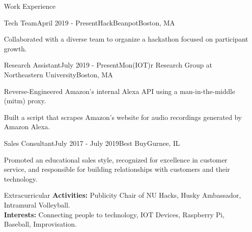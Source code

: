 \documentclass{resume}
\begin{document}
\begin{rSection}{Work Experience}

\begin{rSubsection}{Tech Team}{April 2019 - Present}{HackBeanpot}{Boston, MA}
\item Collaborated with a diverse team to organize a hackathon focused on participant growth.
\end{rSubsection}

\begin{rSubsection}{Research Assistant}{July 2019 - Present}{Mon(IOT)r Research Group at Northeastern University}{Boston, MA}
\item Reverse-Engineered Amazon's internal Alexa API using a man-in-the-middle (mitm) proxy. 
\item Built a script that scrapes Amazon's website for audio recordings generated by Amazon Alexa.
\end{rSubsection}

\begin{rSubsection}{Sales Consultant}{July 2017 - July 2019}{Best Buy}{Gurnee, IL}
\item Promoted an educational sales style, recognized for excellence in customer service, and responsible for building relationships with customers and their technology.
\end{rSubsection}

\end{rSection}

\begin{rSection}{Extracurricular}\itemsep -5pt
{\bf Activities:}
Publicity Chair of NU Hacks, Husky Ambassador, Intramural Volleyball. \\
{\bf Interests:}
Connecting people to technology, IOT Devices, Raspberry Pi, Baseball, Improvisation.
\end{rSection}
\end{document}
